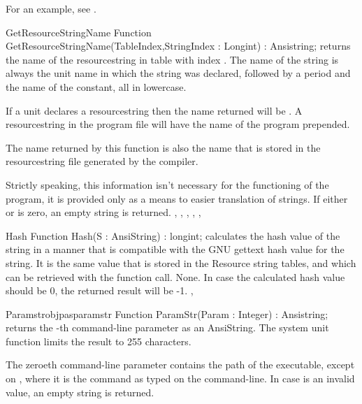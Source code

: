 For an example, see .

\begin{function}{GetResourceStringName}
\Declaration
Function GetResourceStringName(TableIndex,StringIndex : Longint) : Ansistring;
\Description
{} returns the name of the resourcestring in table
 with index . The name of the string is
always the unit name in which the string was declared, followed by a period
and the name of the constant, all in lowercase.

If a unit  declares a resourcestring  then the
name returned will be . A resourcestring in the program file
will have the name of the program prepended.

The name returned by this function is also the name that is stored in the
resourcestring file generated by the compiler.

Strictly speaking, this information isn't necessary for the functioning
of the program, it is provided only as a means to easier translation of
strings.
\Errors
If either  or  is zero, an empty string
is returned.
\SeeAlso
{},
,
,
,
,
\end{function}



\begin{function}{Hash}
\Declaration
Function Hash(S : AnsiString) : longint;
\Description
{} calculates the hash value of the string  in a manner that
is compatible with the GNU gettext hash value for the string. It is the same
value that is stored in the Resource string tables, and which can be
retrieved with the  function call.
\Errors
 None. In case the calculated hash value should be 0, the returned result
will be -1.
\SeeAlso
{},
\end{function}


\begin{functionl}{Paramstr}{objpasparamstr}
\Declaration
Function ParamStr(Param : Integer) : Ansistring;
\Description
{} returns the -th command-line parameter as an
AnsiString. The system unit  function limits the result to
255 characters.

The zeroeth command-line parameter contains the path of the executable,
except on \linux, where it is the command as typed on the command-line.
\Errors
In case  is an invalid value, an empty string is returned.
\SeeAlso
{}
\end{functionl}


